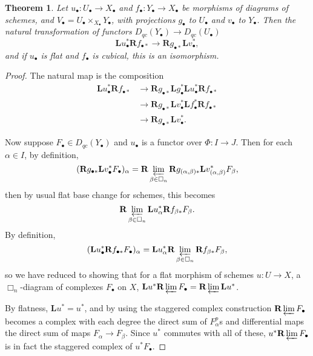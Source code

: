 \documentclass{report}
\newtheorem{theorem}{Theorem}[section]
\theoremstyle{definition}
\newcommand{\bL}{\textbf{L}}
\newcommand{\bR}{\textbf{R}}
\begin{document}
\begin{theorem}
	\label{thm:flatbasechange}
	Let $u_\bullet : U_\bullet \rightarrow X_\bullet$ and $f_\bullet : Y_\bullet \rightarrow X_\bullet$ be morphisms of diagrams of schemes, and $V_\bullet = U_\bullet \times_{X_\bullet} Y_\bullet$, with projections $g_\bullet$ to $U_\bullet$ and $v_\bullet$ to $Y_\bullet$.
	Then the natural transformation of functors $D_{qc}(Y_\bullet) \rightarrow D_{qc}(U_\bullet)$
	\[
		\bL u_\bullet^* \bR f_{\bullet *} \rightarrow \bR g_{\bullet *} \bL v_\bullet^*,
	\]
	and if $u_\bullet$ is flat and $f_\bullet$ is cubical, this is an isomorphism.
\end{theorem}
\begin{proof}
	The natural map is the composition
	\begin{align*}
		\bL u_\bullet^* \bR f_{\bullet *} &\rightarrow \bR g_{\bullet *} \bL g_\bullet^* \bL u_\bullet^* \bR f_{\bullet *} \\
		&\rightarrow \bR g_{\bullet *} \bL v_\bullet^* \bL f_\bullet^* \bR f_{\bullet *} \\
		&\rightarrow \bR g_{\bullet *} \bL v_\bullet^*.
	\end{align*}
	
	Now suppose $F_\bullet \in D_{qc}(Y_\bullet)$ and $u_\bullet$ is a functor over $\Phi : I \rightarrow J$.
	Then for each $\alpha \in I$, by definition,
	\[
		(\bR g_{\bullet *} \bL v_\bullet^* F_\bullet)_\alpha = \bR \varprojlim_{\beta \in \Box_n} \bR g_{(\alpha, \beta) *} \bL v_{(\alpha, \beta)}^* F_\beta,
	\]
	then by usual flat base change for schemes, this becomes
	\[
		 \bR \varprojlim_{\beta \in \Box_n} \bL u_{\alpha}^*  \bR f_{\beta *} F_\beta.
	\]
	By definition,
	\[
		(\bL u_\bullet^* \bR f_{\bullet *} F_\bullet)_\alpha = \bL u_\alpha^* \bR \varprojlim_{\beta \in \Box_n} \bR f_{\beta *} F_\beta,
	\]
	so we have reduced to showing that for a flat morphism of schemes $u : U \rightarrow X$, a $\Box_n$-diagram of complexes $F_\bullet$ on $X$, $\bL u^* \bR \varprojlim F_\bullet = \bR \varprojlim \bL u^*$.
	
	By flatness, $\bL u^* = u^*$, and by using the staggered complex construction $\bR \varprojlim F_\bullet$ becomes a complex with each degree the direct sum of $F_\alpha^p$s and differential maps the direct sum of maps $F_\alpha \rightarrow F_\beta$.
	Since $u^*$ commutes with all of these, $u^* \bR \varprojlim F_\bullet$ is in fact the staggered complex of $u^* F_\bullet$.
\end{proof}
\end{document}
